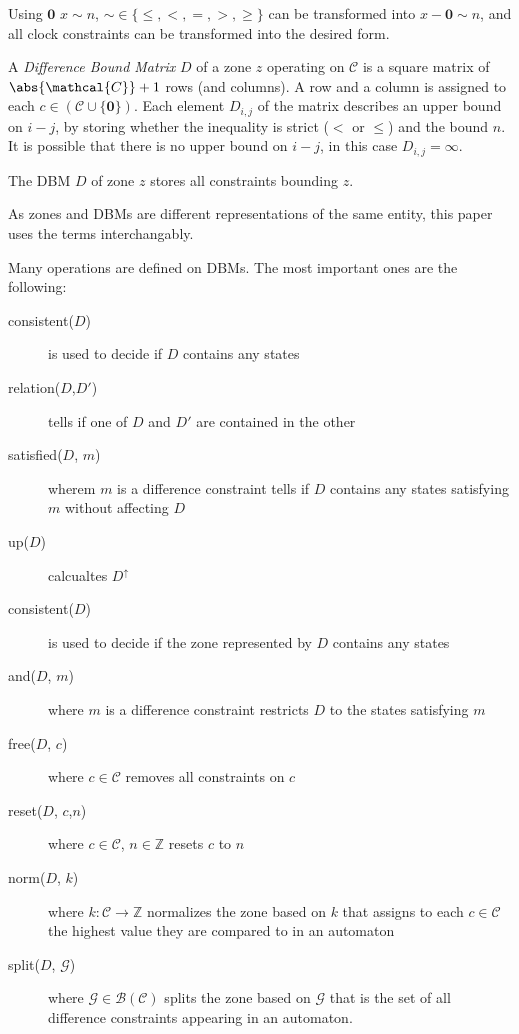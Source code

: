 Using $\textbf{0}$ $x \sim n$,  $\sim \in \{\leq,<,=,>,\geq\}$ can be transformed into $x- \textbf{0} \sim n$, and all clock constraints can be transformed into the desired form. 


\begin{dfn}
	A \emph{Difference Bound Matrix} $D$ of a zone $z$ operating on $\mathcal{C}$ is a square matrix of $\abs{\mathcal{C}}+1$ rows (and columns). A row and a column is assigned to each $c \in (\mathcal{C} \cup \{\textbf{0}\})$. Each element $D_{i,j}$ of the matrix describes an upper bound on $i - j$, by storing whether the inequality is strict ($<$ or $\leq$) and the bound $n$. It is possible that there is no upper bound on $i-j$, in this case $D_{i,j}=\infty$.
	
	The DBM $D$ of zone $z$ stores all constraints bounding $z$.
\end{dfn}

%

As zones and DBMs are different representations of the same entity, this paper uses the terms interchangably.

Many operations are defined on DBMs. The most important ones are the following:

\begin{description}
	\item [consistent($D$)] is used to decide if $D$ contains any states
	\item [relation($D$,$D'$)] tells if one of $D$ and $D'$ are contained in the other 
	\item [satisfied($D$, $m$)] wherem $m$ is a difference constraint tells if $D$ contains any states satisfying $m$ without affecting $D$
	\item [up($D$)] calcualtes $D^\uparrow$
	 \item [consistent($D$)] is used to decide if the zone represented by $D$ contains any states
	 \item [and($D$, $m$)] where $m$ is a difference constraint restricts $D$ to the states satisfying $m$
	 \item [free($D$, $c$)] where $c \in \mathcal{C}$  removes all constraints on $c$
	 \item [reset($D$, $c$,$n$)] where $c \in \mathcal{C}$, $n \in \mathds{Z}$  resets $c$ to $n$
	 \item [norm($D$, $k$)] where $k:\mathcal{C} \to \mathds{Z}$ normalizes the zone based on $k$ that assigns to each $c \in \mathcal{C}$ the highest value they are compared to in an automaton
	 \item [split($D$, $\mathcal{G}$)] where $\mathcal{G} \in \mathcal{B}(\mathcal{C})$ splits the zone based on $\mathcal{G}$ that is the set of all difference constraints appearing in an automaton.
\end{description}

